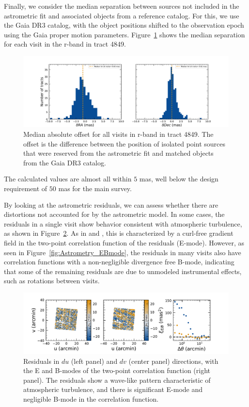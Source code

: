 Finally, we consider the median separation between sources not included in the astrometric fit and associated objects from a reference catalog.
For this, we use the Gaia \gls{DR3} catalog, with the object positions shifted to the observation epoch using the Gaia proper motion parameters.
Figure~\ref{fig:AA1} shows the median separation for each visit in the r-band in \gls{tract} 4849.
\begin{figure}[htb!]
\centering
\includegraphics[width=0.98\linewidth]{Astrometry_AA1.pdf}
\caption{Median absolute offset for all visits in r-band in \gls{tract} 4849. The offset is the difference between the position of isolated point sources that were reserved from the astrometric fit and matched objects from the Gaia DR3 catalog.}
\label{fig:AA1}
\vspace{0.1cm}
\end{figure}


The calculated values are almost all within $5$\xspace mas, well below the design requirement of $50$\xspace mas for the main survey.

By looking at the astrometric residuals, we can assess whether there are distortions not accounted for by the astrometric model.
In some cases, the residuals in a single visit show behavior consistent with atmospheric turbulence, as shown in Figure~\ref{fig:Astrometry_Emode}.
As in \citet{Leget2021} and \citet{Fortino2021}, this is characterized by a curl-free gradient field in the two-point correlation function of the residuals (E-mode). However, as seen in Figure~\ref{fig:Astrometry_EBmode}, the residuals in many visits also have correlation functions with a non-negligible divergence free B-mode, indicating that some of the remaining residuals are due to unmodeled instrumental effects, such as rotations between visits.
\begin{figure}[htb!]
\centering
\includegraphics[width=0.98\linewidth]{figures/Astrometry_2024120200359.pdf}
\caption{\small Residuals in $du$ (left panel) and $dv$ (center panel) directions, with the E and \gls{B}-modes of the two-point correlation function (right panel). The residuals show a wave-like pattern characteristic of atmospheric turbulence, and there is significant E-mode and negligible \gls{B}-mode in the correlation function.}
\label{fig:Astrometry_Emode}
\vspace{0.1cm}
\end{figure}


